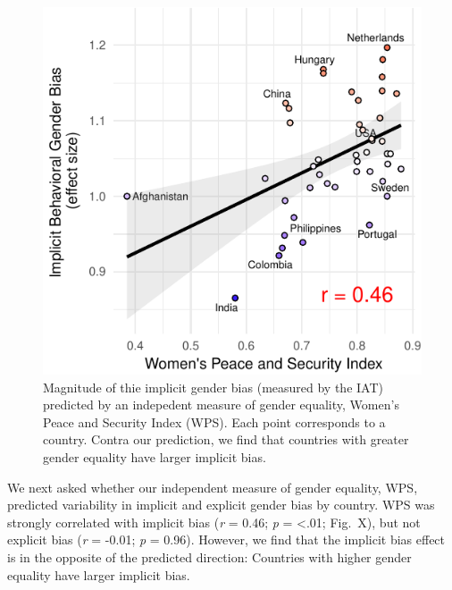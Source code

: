 \documentclass[10pt, letterpaper]{article}
\newenvironment{CodeChunk}{}{}
\begin{document}
\begin{CodeChunk}
\begin{figure}[t]

{\centering \includegraphics{figs/WPS_plot-1} 

}

\caption[Magnitude of thie implicit gender bias (measured by the IAT) predicted by an indepedent measure of gender equality, Women's Peace and Security Index (WPS)]{Magnitude of thie implicit gender bias (measured by the IAT) predicted by an indepedent measure of gender equality, Women's Peace and Security Index (WPS).  Each point corresponds to a country. Contra our prediction, we find that countries with greater gender equality have larger implicit bias.}\label{fig:WPS_plot}
\end{figure}
\end{CodeChunk}

We next asked whether our independent measure of gender equality, WPS,
predicted variability in implicit and explicit gender bias by country.
WPS was strongly correlated with implicit bias (\emph{r} = 0.46;
\emph{p} = \textless{}.01; Fig.~X), but not explicit bias (\emph{r} =
-0.01; \emph{p} = 0.96). However, we find that the implicit bias effect
is in the opposite of the predicted direction: Countries with higher
gender equality have larger implicit bias.
\end{document}
